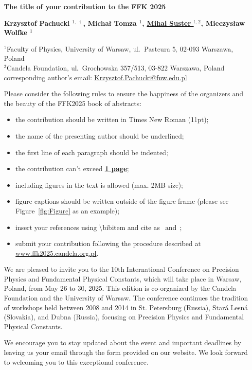 \documentclass[11pt]{article}
\newcommand{\abstracttitle}[1]{
\setstretch{1.15}	%
 \begin{center}{\Large {\bf #1}}\end{center}
\setstretch{1.0}
}
\newcommand{\authors}[1]{
 \begin{center}{\bf #1} \end{center}
 \setstretch{1.0}
}
\newcommand{\addresses}[1]{
\setstretch{0.95}
 \begin{center}{\small #1} \end{center}
\setstretch{1}
}
\begin{document}
\abstracttitle{The title of your contribution to the FFK 2025}
\authors{
Krzysztof Pachucki $^{1,~\dag}$,
Michał Tomza $^{1}$,
\underline{Mihai Suster $^{1,2}$},
Mieczysław Wolfke $^{1}$
} 

\addresses{%
$^{1}$Faculty of Physics, University of Warsaw, ul.~Pasteura 5, 02-093 Warszawa, Poland \\
$^{2}$Candela Foundation, ul.~Grochowska 357/513, 03-822 Warszawa, Poland \\
\dag corresponding author's email:  \href{mailto:Krzysztof.Pachucki@fuw.edu.pl}{Krzysztof.Pachucki@fuw.edu.pl}
}


	Please consider the following rules to ensure the happiness of the organizers and the beauty of the FFK2025 book of abstracts:
\begin{itemize}	
\item the contribution should be written in Times New Roman (11pt);
\item the name of the presenting author should be underlined;
\item the first line of each paragraph should be indented;
\item the contribution can't exceed \textbf{\underline{1 page}};
\item including figures in the text is allowed (max. 2MB size);
\item figure captions should be written outside of the figure frame (please see Figure~\ref{fig:Figure} as an example);
\item insert your references using \textbackslash bibitem and cite as~\cite{AuthorsAB2024} and~\cite{AuthorsCDE2023};
\item submit your contribution following the procedure described at \url{www.ffk2025.candela.org.pl}.
\end{itemize}

We are pleased to invite you to the 10th International Conference on Precision Physics and Fundamental Physical Constants, which will take place in Warsaw, Poland, from May 26 to 30, 2025. This edition is co-organized by the Candela Foundation and the University of Warsaw. The conference continues the tradition of workshops held between 2008 and 2014 in St. Petersburg (Russia), Stará Lesná (Slovakia), and Dubna (Russia), focusing on Precision Physics and Fundamental Physical Constants.

We encourage you to stay updated about the event and important deadlines by leaving us your email through the form provided on our website. We look forward to welcoming you to this exceptional conference.
\end{document}
